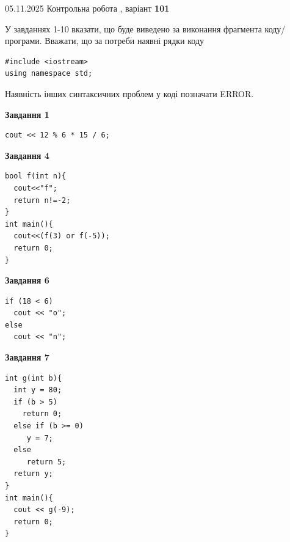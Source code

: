 \documentclass[12pt, ukrainian]{article}
\begin{document}
\newpage

{\Large{05.11.2025 Контрольна робота , варіант  \No \textbf { 101 }\par}}
{
\begin {large}
У завданнях 1-10 вказати, що буде виведено за виконання фрагмента коду/про\-гра\-ми.
Вважати, що за потреби наявні рядки коду
\begin{verbatim}
#include <iostream>
using namespace std;
\end{verbatim}
Наявність інших синтаксичних проблем у коді позначати ERROR.

\begin{minipage}[t]{7.0cm}

\begin{center}
\textbf{Завдання 1}
\end{center}
\vspace{-8mm}

\begin{verbatim}
cout << 12 % 6 * 15 / 6;
\end{verbatim}



\begin{center}
\textbf{Завдання 4}
\end{center}
\vspace{-8mm}

\begin{verbatim}
bool f(int n){
  cout<<"f";
  return n!=-2;
}
int main(){
  cout<<(f(3) or f(-5));
  return 0;
}
\end{verbatim}



\begin{center}
\textbf{Завдання 6}
\end{center}
\vspace{-8mm}

\begin{verbatim}
if (18 < 6)
  cout << "o";
else
  cout << "n";
\end{verbatim}



\begin{center}
\textbf{Завдання 7}
\end{center}
\vspace{-8mm}

\begin{verbatim}
int g(int b){
  int y = 80;
  if (b > 5)
    return 0;
  else if (b >= 0)
     y = 7;
  else
     return 5;
  return y;
}
int main(){
  cout << g(-9);
  return 0;
}
\end{verbatim}


\end{minipage}
\end{large}}
\end{document}
